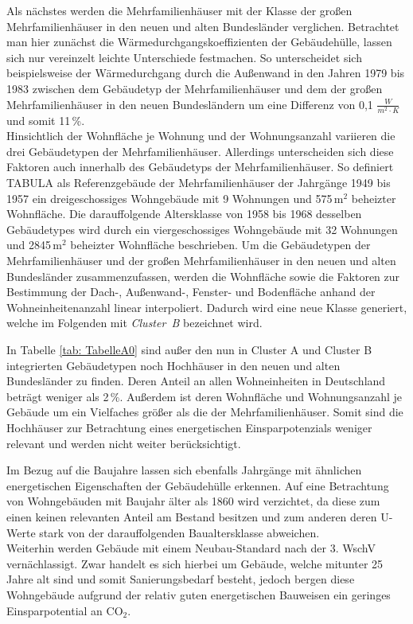 Als nächstes werden die Mehrfamilienhäuser mit der Klasse der großen Mehrfamilienhäuser in den neuen und alten Bundesländer verglichen.
Betrachtet man hier zunächst die Wärmedurchgangskoeffizienten der Gebäudehülle, lassen sich nur vereinzelt leichte Unterschiede festmachen.
So unterscheidet sich beispielsweise der Wärmedurchgang durch die Außenwand in den Jahren 1979 bis 1983 zwischen dem Gebäudetyp der Mehrfamilienhäuser und dem der großen Mehrfamilienhäuser in den neuen Bundesländern um eine Differenz von 0,1 \(\frac{W}{m^2 \cdot K}\) und somit 11\,\%. \\
Hinsichtlich der Wohnfläche je Wohnung und der Wohnungsanzahl variieren die drei Gebäudetypen der Mehrfamilienhäuser.
Allerdings unterscheiden sich diese Faktoren auch innerhalb des Gebäudetyps der Mehrfamilienhäuser.
So definiert TABULA als Referenzgebäude der Mehrfamilienhäuser der Jahrgänge 1949 bis 1957 ein dreigeschossiges Wohngebäude mit 9 Wohnungen und 575\,m\(^2\) beheizter Wohnfläche. 
Die darauffolgende Altersklasse von 1958 bis 1968 desselben Gebäudetypes wird durch ein viergeschossiges Wohngebäude mit 32 Wohnungen und 2845\,m\(^2\) beheizter Wohnfläche beschrieben.
Um die Gebäudetypen der Mehrfamilienhäuser und der großen Mehrfamilienhäuser in den neuen und alten Bundesländer zusammenzufassen, werden die Wohnfläche sowie die Faktoren zur Bestimmung der Dach-, Außenwand-, Fenster- und Bodenfläche anhand der Wohneinheitenanzahl linear interpoliert.
Dadurch wird eine neue Klasse generiert, welche im Folgenden mit \mbox{\textit{Cluster B}} bezeichnet wird.

In Tabelle \ref{tab: TabelleA0} sind außer den nun in Cluster A und Cluster B integrierten Gebäudetypen noch Hochhäuser in den neuen und alten Bundesländer zu finden.
Deren Anteil an allen Wohneinheiten in Deutschland beträgt weniger als 2\,\%. 
Außerdem ist deren Wohnfläche und Wohnungsanzahl je Gebäude um ein Vielfaches größer als die der Mehrfamilienhäuser.
Somit sind die Hochhäuser zur Betrachtung eines energetischen Einsparpotenzials weniger relevant und werden nicht weiter berücksichtigt.

Im Bezug auf die Baujahre lassen sich ebenfalls Jahrgänge mit ähnlichen energetischen Eigenschaften der Gebäudehülle erkennen.
Auf eine Betrachtung von Wohngebäuden mit Baujahr älter als 1860 wird verzichtet, da diese zum einen keinen relevanten Anteil am Bestand besitzen und zum anderen deren U-Werte stark von der darauffolgenden Baualtersklasse abweichen.\\
Weiterhin werden Gebäude mit einem Neubau-Standard nach der 3. WschV vernächlassigt.
Zwar handelt es sich hierbei um Gebäude, welche mitunter 25 Jahre alt sind und somit Sanierungsbedarf besteht, jedoch bergen diese Wohngebäude aufgrund der relativ guten energetischen Bauweisen ein geringes Einsparpotential an CO\(_2\).

